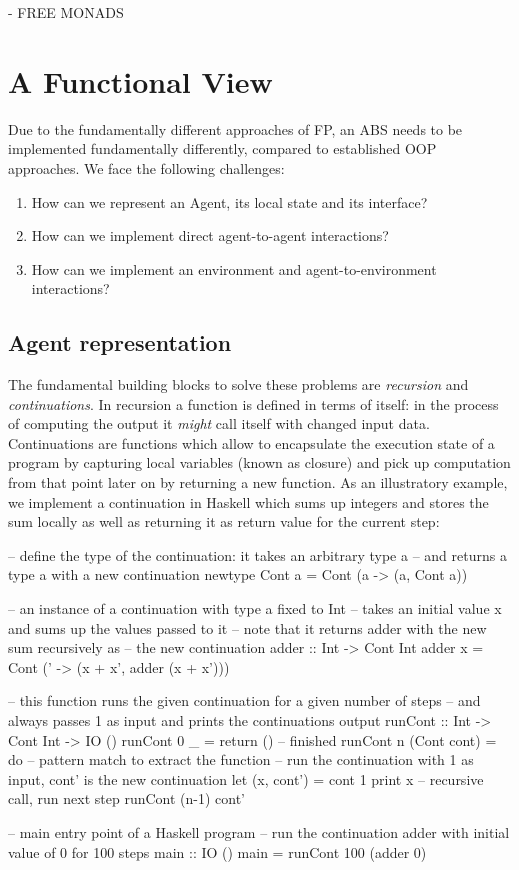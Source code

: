 - FREE MONADS %

\section{A Functional View}
Due to the fundamentally different approaches of FP, an ABS needs to be implemented fundamentally differently, compared to established OOP approaches. We face the following challenges:

\begin{enumerate}
	\item How can we represent an Agent, its local state and its interface?
	\item How can we implement direct agent-to-agent interactions?
	\item How can we implement an environment and agent-to-environment interactions? 
\end{enumerate}

\subsection{Agent representation}
The fundamental building blocks to solve these problems are \textit{recursion} and \textit{continuations}. In recursion a function is defined in terms of itself: in the process of computing the output it \textit{might} call itself with changed input data. Continuations are functions which allow to encapsulate the execution state of a program by capturing local variables (known as closure) and pick up computation from that point later on by returning a new function. As an illustratory example, we implement a continuation in Haskell which sums up integers and stores the sum locally as well as returning it as return value for the current step:

\begin{HaskellCode}
-- define the type of the continuation: it takes an arbitrary type a 
-- and returns a type a with a new continuation
newtype Cont a = Cont (a -> (a, Cont a))

-- an instance of a continuation with type a fixed to Int
-- takes an initial value x and sums up the values passed to it
-- note that it returns adder with the new sum recursively as 
-- the new continuation
adder :: Int -> Cont Int
adder x = Cont (\x' -> (x + x', adder (x + x')))

-- this function runs the given continuation for a given number of steps
-- and always passes 1 as input and prints the continuations output
runCont :: Int -> Cont Int -> IO ()
runCont 0 _ = return () -- finished
runCont n (Cont cont) = do -- pattern match to extract the function
  -- run the continuation with 1 as input, cont' is the new continuation
  let (x, cont') = cont 1
  print x
  -- recursive call, run next step
  runCont (n-1) cont'

-- main entry point of a Haskell program
-- run the continuation adder with initial value of 0 for 100 steps 
main :: IO ()
main = runCont 100 (adder 0)
\end{HaskellCode}


